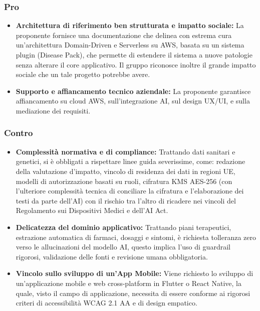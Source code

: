 \subsubsection{Pro}
\begin{itemize}
    \item \textbf{Architettura di riferimento ben strutturata e impatto sociale:} La proponente fornisce una documentazione che delinea con estrema cura un'architettura Domain-Driven e Serverless su AWS, basata su un sistema plugin (Disease Pack), che permette di estendere il sistema a nuove patologie senza alterare il core applicativo. Il gruppo riconosce inoltre il grande impatto sociale che un tale progetto potrebbe avere.
    \item \textbf{Supporto e affiancamento tecnico aziendale:} La proponente garantisce affiancamento su cloud AWS, sull'integrazione AI, sul design UX/UI, e sulla mediazione dei requisiti.
\end{itemize}

\subsubsection{Contro}
\begin{itemize}
    \item \textbf{Complessità normativa e di compliance:} Trattando dati sanitari e genetici, si è obbligati a rispettare linee guida severissime, come: redazione della valutazione d'impatto, vincolo di residenza dei dati in regioni UE,  modelli di autorizzazione basati su ruoli, cifratura KMS AES-256 (con l'ulteriore complessità tecnica di conciliare la cifratura e l'elaborazione dei testi da parte dell'AI) con il rischio tra l'altro di ricadere nei vincoli del Regolamento sui Dispositivi Medici e dell'AI Act.
    \item \textbf{Delicatezza del dominio applicativo:} Trattando piani terapeutici, estrazione automatica di farmaci, dosaggi e sintomi, è richiesta tolleranza zero verso le allucinazioni del modello AI, questo implica l'uso di guardrail rigorosi, validazione delle fonti e revisione umana obbligatoria.
    \item \textbf{Vincolo sullo sviluppo di un'App Mobile:} Viene richiesto lo sviluppo di un'applicazione mobile e web cross-platform in Flutter o React Native, la quale, visto il campo di applicazione, necessita di essere conforme ai rigorosi criteri di accessibilità WCAG 2.1 AA e di design empatico.
\end{itemize}

